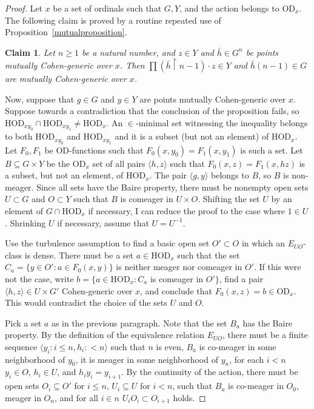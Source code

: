 \documentclass{article}
\newcommand{\hvd}{\mathrm{HOD}}
\newcommand{\vd}{\mathrm{OD}}
\newtheorem{claim}[theorem]{Claim}
\theoremstyle{definition}
\begin{document}
\begin{proof}
Let $x$ be a set of ordinals such that $G, Y$, and the action belongs to $\vd_x$. The following claim is proved by a routine repeated use of Proposition~\ref{mutualproposition}.

\begin{claim}
Let $n\geq 1$ be a natural number, and $z\in Y$ and $\bar h\in G^n$ be points mutually Cohen-generic over $x$. Then $\prod(\bar h\restriction n-1)\cdot z\in Y$ and $\bar h(n-1)\in G$ are mutually Cohen-generic over $x$.
\end{claim}
 
Now, suppose that $g\in G$ and $y\in Y$ are points mutually Cohen-generic over $x$. Suppose towards a contradiction that the conclusion of the proposition fails, so $\hvd_{xy_0}\cap\hvd_{xy_1}\neq\hvd_x$. An $\in$-minimal set witnessing the inequality belongs to both $\hvd_{xy_0}$ and $\hvd_{xy_1}$ and it is a subset (but not an element) of $\hvd_x$. Let $F_0, F_1$ be $\vd$-functions such that $F_0(x, y_0)=F_1(x, y_1)$ is such a set. Let $B\subseteq G\times Y$ be the $\vd_x$ set of all pairs $\langle h, z\rangle$ such that $F_0(x, z)=F_1(x, hz)$ is a subset, but not an element, of $\hvd_x$. The pair $\langle g, y\rangle$ belongs to $B$, so $B$ is non-meager. Since all sets have the Baire property, there must be nonempty open sets $U\subset G$ and $O\subset Y$ such that $B$ is comeager in $U\times O$. Shifting the set $U$ by an element of $G\cap\hvd_x$ if necessary, I can reduce the proof to the case where $1\in U$. Shrinking $U$ if necessary, assume that $U=U^{-1}$.

Use the turbulence assumption to find a basic open set $O'\subset O$ in which an $E_{UO}$-class is dense. There must be a set $a\in\hvd_x$ such that the set $C_a=\{y\in O'\colon a\in F_0(x, y)\}$ is neither meager nor comeager in $O'$. If this were not the case,  write $b=\{a\in\hvd_x\colon C_a$ is comeager in $O'\}$, find a pair $\langle h, z\rangle\in U\times G'$ Cohen-generic over $x$, and conclude that $F_0(x, z)=b\in\vd_x$. This would contradict the choice of the sets $U$ and $O$.

Pick a set $a$ as in the previous paragraph. Note that the set $B_a$ has the Baire property. By the definition of the equivalence relation $E_{UO}$, there must be a finite sequence $\langle y_i\colon i\leq n, h_i\colon <n\rangle$ such that $n$ is even, $B_a$ is co-meager in some neighborhood of $y_0$, it is meager in some neighborhood of $y_n$, for each $i<n$ $y_i\in O$, $h_i\in U$, and $h_iy_i=y_{i+1}$. By the continuity of the action, there must be open sets $O_i\subseteq O'$ for $i\leq n$, $U_i\subseteq U$ for $i<n$, such that $B_a$ is co-meager in $O_0$, meager in $O_n$, and for all $i\in n$ $U_iO_i\subset O_{i+1}$ holds.


\end{proof}
\end{document}
